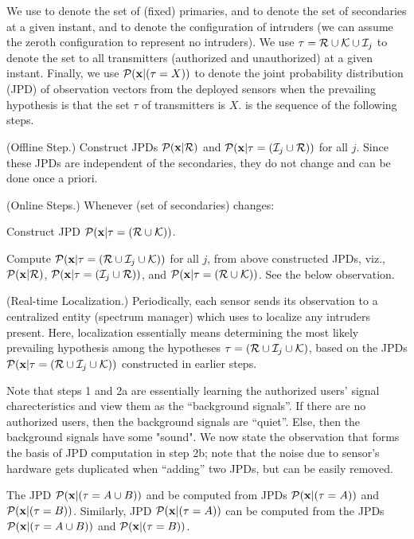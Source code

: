 We use \Pa to denote the set of (fixed) primaries, and \Ka to denote
the set of secondaries at a given instant, and \ii to denote the \jth
configuration of intruders (we can assume the zeroth configuration to
represent no intruders). We use $\tau = \mathcal{R} \cup \mathcal{K} \cup \mathcal{I}_{j}$ to denote the
set to all transmitters (authorized and unauthorized) at a given
instant.  Finally, we use $\mathcal{P}(\mathbf{x} | (\tau = X))$ to denote the joint
probability distribution (JPD) of observation vectors from the
deployed sensors when the prevailing hypothesis is that the set $\tau$
of transmitters is $X$. \ouralgoss is the sequence of the following steps.
\begin{packedenumerate}
	\item
	(Offline Step.) Construct JPDs $\mathcal{P}(\mathbf{x} | \mathcal{R})$ and $\mathcal{P}(\mathbf{x} | \tau = (\mathcal{I}_{j} \cup \mathcal{R}))$ for all $j$. Since these JPDs 
	are independent of the secondaries, they do not change and
	can be done once a priori.
	\item
	(Online Steps.) Whenever \Ka (set of secondaries) changes:
	\begin{packedalpha}
		\item Construct JPD $\mathcal{P}(\mathbf{x} | \tau = (\mathcal{R} \cup \mathcal{K}))$. 
		\item Compute $\mathcal{P}(\mathbf{x} | \tau = (\mathcal{R} \cup \mathcal{I}_{j} \cup
                  \mathcal{K}))$ for all $j$, from above constructed JPDs,
                  viz., $\mathcal{P}(\mathbf{x} | \mathcal{R})$, $\mathcal{P}(\mathbf{x} | \tau = (\mathcal{I}_{j} \cup
                  \mathcal{R}))$, and $\mathcal{P}(\mathbf{x} | \tau = (\mathcal{R} \cup \mathcal{K}))$. See
                  the below observation.
	\end{packedalpha}
	\item
	(Real-time Localization.) Periodically, each sensor sends its
          observation to a centralized entity (spectrum
          manager) which uses \ouralgo to localize any intruders
          present. Here, localization essentially means determining
          the most likely prevailing hypothesis among the hypotheses
          $\tau = (\mathcal{R} \cup \mathcal{I}_{j} \cup \mathcal{K})$, based on the JPDs $\mathcal{P}(\mathbf{x} | \tau = (\mathcal{R} \cup \mathcal{I}_{j} \cup \mathcal{K}))$ constructed in earlier
          steps.
\end{packedenumerate}

Note that steps 1 and 2a are essentially learning the authorized users' signal charecteristics
and view them as the ``background signals''. 
If there are no authorized users, then the background signals are ``quiet''. Else, then the background signals have some "sound".
We now state the observation that forms the basis of JPD computation
in step 2b; note that the noise due to sensor's hardware gets
duplicated when ``adding'' two JPDs, but can be easily removed.
\begin{obs}
  The JPD $\mathcal{P}(\mathbf{x} | (\tau = A \cup B))$ and be computed from JPDs $\mathcal{P}(\mathbf{x} | (\tau = A))$ and $\mathcal{P}(\mathbf{x} | (\tau = B))$.  Similarly,
  JPD $\mathcal{P}(\mathbf{x} | (\tau = A))$ can be computed from the JPDs $\mathcal{P}(\mathbf{x} | (\tau = A
\cup B))$ and $\mathcal{P}(\mathbf{x} | (\tau = B))$.
\end{obs}

